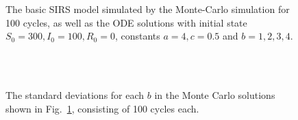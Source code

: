 \documentclass[10pt,showpacs,preprintnumbers,amsmath,amssymb,nofootinbib,aps,prl,twocolumn,groupedaddress,superscriptaddress,showkeys]{revtex4-1}
\begin{document}
\begin{figure}[h!tb]
  \caption{\label{fig:ab_plots}The basic SIRS model simulated by the Monte-Carlo simulation for 100 cycles, as well as the ODE solutions with initial state $S_0 = 300, I_0 = 100, R_0 = 0$, constants $a=4, c=0.5$ and $b=1,2,3,4$.}
\end{figure}

\begin{figure}[h!tb]
  \centering
   \\
   \\
  \caption{\label{fig:standard deviations b}The standard deviations for each $b$ in the Monte Carlo solutions shown in Fig.~\ref{fig:ab_plots}, consisting of 100 cycles each.}
\end{figure}
\end{document}
